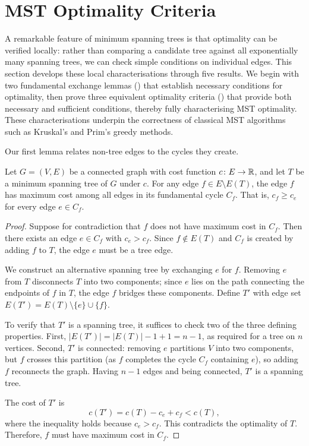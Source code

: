 \section{MST Optimality Criteria}\label{sec:mst-criteria}

A remarkable feature of minimum spanning trees is that optimality can be verified locally: rather than comparing a candidate tree against all exponentially many spanning trees, we can check simple conditions on individual edges.
This section develops these local characterisations through five results.
We begin with two fundamental exchange lemmas () that establish necessary conditions for optimality, then prove three equivalent optimality criteria () that provide both necessary and sufficient conditions, thereby fully characterising MST optimality.
These characterisations underpin the correctness of classical MST algorithms such as Kruskal's and Prim's greedy methods.

Our first lemma relates non-tree edges to the cycles they create.

\begin{lemma}\label{lem:fund-cycle}
Let $G = (V, E)$ be a connected graph with cost function $c \colon E \to \mathbb{R}$, and let $T$ be a minimum spanning tree of $G$ under $c$.
For any edge $f \in E \setminus E(T)$, the edge $f$ has maximum cost among all edges in its fundamental cycle $C_f$.
That is, $c_f \geq c_e$ for every edge $e \in C_f$.
\end{lemma}

\begin{proof}
Suppose for contradiction that $f$ does not have maximum cost in $C_f$.
Then there exists an edge $e \in C_f$ with $c_e > c_f$.
Since $f \notin E(T)$ and $C_f$ is created by adding $f$ to $T$, the edge $e$ must be a tree edge.

We construct an alternative spanning tree by exchanging $e$ for $f$.
Removing $e$ from $T$ disconnects $T$ into two components; since $e$ lies on the path connecting the endpoints of $f$ in $T$, the edge $f$ bridges these components.
Define $T'$ with edge set $E(T') = E(T) \setminus \{e\} \cup \{f\}$.

To verify that $T'$ is a spanning tree, it suffices to check two of the three defining properties.
First, $|E(T')| = |E(T)| - 1 + 1 = n - 1$, as required for a tree on $n$ vertices.
Second, $T'$ is connected: removing $e$ partitions $V$ into two components, but $f$ crosses this partition (as $f$ completes the cycle $C_f$ containing $e$), so adding $f$ reconnects the graph.
Having $n - 1$ edges and being connected, $T'$ is a spanning tree.

The cost of $T'$ is
\[
c(T') = c(T) - c_e + c_f < c(T),
\]
where the inequality holds because $c_e > c_f$.
This contradicts the optimality of $T$.
Therefore, $f$ must have maximum cost in $C_f$.
\end{proof}

